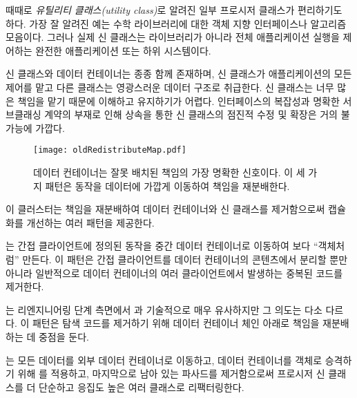 \documentclass[a4paper,10pt,twoside]{book}
\begin{document}
때때로 \emph{유틸리티 클래스(utility class)}로 알려진 일부 프로시저 클래스가 편리하기도 하다. 가장 잘 알려진 예는 수학 라이브러리에 대한 객체 지향 인터페이스나 알고리즘 모음이다. 그러나 실제 신 클래스는 라이브러리가 아니라 전체 애플리케이션 실행을 제어하는 완전한 애플리케이션 또는 하위 시스템이다.

신 클래스와 데이터 컨테이너는 종종 함께 존재하며, 신 클래스가 애플리케이션의 모든 제어를 맡고 다른 클래스는 영광스러운 데이터 구조로 취급한다. 신 클래스는 너무 많은 책임을 맡기 때문에 이해하고 유지하기가 어렵다. 인터페이스의 복잡성과 명확한 서브클래싱 계약의 부재로 인해 상속을 통한 신 클래스의 점진적 수정 및 확장은 거의 불가능에 가깝다.

\begin{figure}[h]
\begin{center}
\texttt{[image: oldRedistributeMap.pdf]}
\caption{데이터 컨테이너는 잘못 배치된 책임의 가장 명확한 신호이다. 이 세 가지 패턴은 동작을 데이터에 가깝게 이동하여 책임을 재분배한다.}
\end{center}
\end{figure}

이 클러스터는 책임을 재분배하여 데이터 컨테이너와 신 클래스를 제거함으로써 캡슐화를 개선하는 여러 패턴을 제공한다.

\begin{bulletlist}
\item {}는 간접 클라이언트에 정의된 동작을 중간 데이터 컨테이너로 이동하여 보다 ``객체처럼'' 만든다. 이 패턴은 간접 클라이언트를 데이터 컨테이너의 콘텐츠에서 분리할 뿐만 아니라 일반적으로 데이터 컨테이너의 여러 클라이언트에서 발생하는 중복된 코드를 제거한다.

\item {}는 리엔지니어링 단계 측면에서 과 기술적으로 매우 유사하지만 그 의도는 다소 다르다. 이 패턴은 탐색 코드를 제거하기 위해 데이터 컨테이너 체인 아래로 책임을 재분배하는 데 중점을 둔다.
	
\item {}는 모든 데이터를 외부 데이터 컨테이너로 이동하고, 데이터 컨테이너를 객체로 승격하기 위해 를 적용하고, 마지막으로 남아 있는 파사드를 제거함으로써 프로시저 신 클래스를 더 단순하고 응집도 높은 여러 클래스로 리팩터링한다.
\end{bulletlist}
\end{document}
